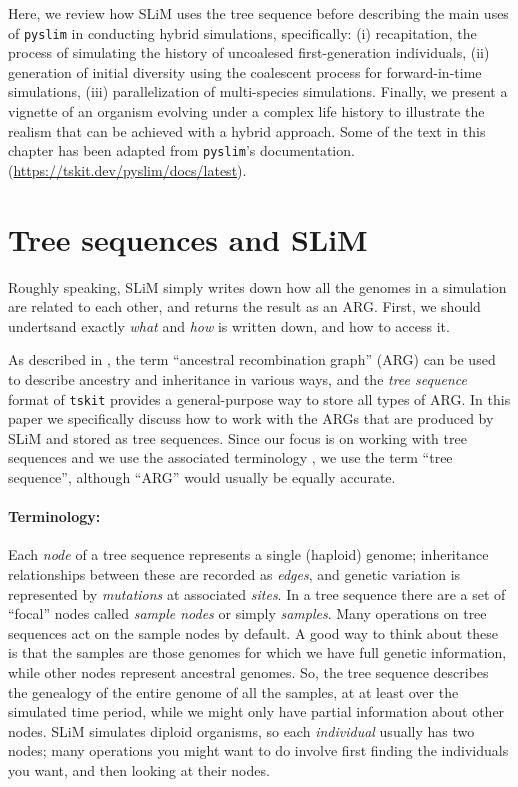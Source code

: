 \documentclass[12pt]{article}
\newcommand{\tskit}[0]{\texttt{tskit}\xspace}
\newcommand{\pyslim}[0]{\texttt{pyslim}\xspace}
\begin{document}
Here, we review how SLiM uses the tree sequence before describing the main uses of \pyslim in conducting hybrid simulations, specifically:
(i) recapitation, the process of simulating the history of uncoalesed first-generation individuals,
(ii) generation of initial diversity using the coalescent process for forward-in-time simulations,
(iii) parallelization of multi-species simulations.
Finally, we present a vignette of an organism evolving under a complex life history to illustrate the realism that can be achieved with a hybrid approach.
Some of the text in this chapter has been adapted from \pyslim's documentation.
(\url{https://tskit.dev/pyslim/docs/latest}).

\section{Tree sequences and SLiM}

Roughly speaking, SLiM simply writes down
how all the genomes in a simulation are related to each other,
and returns the result as an ARG.
First, we should undertsand exactly \emph{what} and \emph{how} is written down,
and how to access it.

As described in \citet{wong},
the term ``ancestral recombination graph'' (ARG) can be used to describe ancestry and inheritance
in various ways,
and the \emph{tree sequence} format of \tskit
provides a general-purpose way to store all types of ARG.
In this paper we specifically discuss how to work with the ARGs that are produced by SLiM
and stored as tree sequences.
Since our focus is on working with tree sequences
and we use the associated terminology \citet{XXX},
we use the term ``tree sequence'',
although ``ARG'' would usually be equally accurate.

\paragraph{Terminology:}
Each \textit{node} of a tree sequence represents a single (haploid) genome;
inheritance relationships between these are recorded as \textit{edges},
and genetic variation is represented by \textit{mutations} at associated \textit{sites}.
In a tree sequence there are
a set of ``focal'' nodes called \textit{sample nodes} or simply \textit{samples}.
Many operations on tree sequences act on the sample nodes by default.
A good way to think about these is that the samples are those genomes
for which we have full genetic information,
while other nodes represent ancestral genomes.
So, the tree sequence describes the genealogy of the
entire genome of all the samples, at at least over the simulated time period,
while we might only have partial information about other nodes.
SLiM simulates diploid organisms, so each \textit{individual} usually has two nodes;
many operations you might want to do involve first finding the individuals you want,
and then looking at their nodes.
\end{document}
